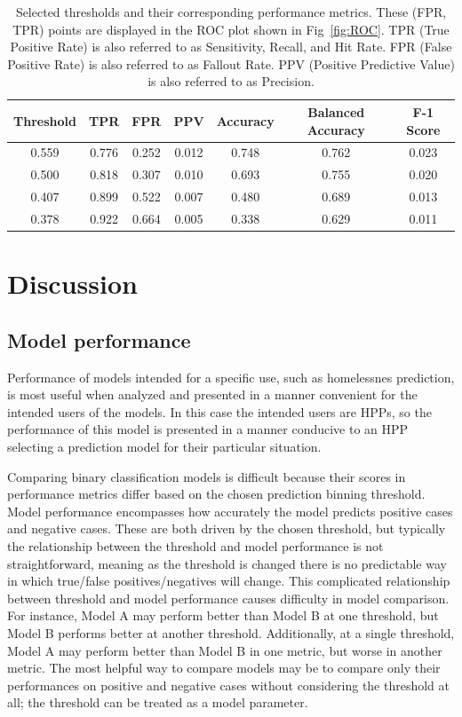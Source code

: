 \documentclass[10pt,letterpaper]{article}
\begin{document}
\begin{table}[htb]
    \centering
    \begin{tabular}{ccccccc}
        \toprule
        Threshold   &   TPR &   FPR & PPV   & Accuracy  &  Balanced Accuracy    & F-1 Score \\
        \midrule
        0.559       & 0.776 & 0.252 & 0.012 &     0.748 &     0.762             & 0.023 \\
        0.500       & 0.818 & 0.307 & 0.010 &     0.693 &     0.755             & 0.020 \\
        0.407       & 0.899 & 0.522 & 0.007 &     0.480 &     0.689             & 0.013 \\
        0.378       & 0.922 & 0.664 & 0.005 &     0.338 &     0.629             & 0.011 \\
        \bottomrule
    \end{tabular}
    \caption{Selected thresholds and their corresponding performance metrics. These (FPR, TPR) points are displayed in the ROC plot shown in Fig~\ref{fig:ROC}. TPR (True Positive Rate) is also referred to as Sensitivity, Recall, and Hit Rate. FPR (False Positive Rate) is also referred to as Fallout Rate. PPV (Positive Predictive Value) is also referred to as Precision.}
    \label{tbl:performance}
\end{table}

\section*{Discussion}
\subsection*{Model performance}
Performance of models intended for a specific use, such as homelessnes prediction, is most useful when analyzed and presented in a manner convenient for the intended users of the models. In this case the intended users are HPPs, so the performance of this model is presented in a manner conducive to an HPP selecting a prediction model for their particular situation.

Comparing binary classification models is difficult because their scores in performance metrics differ based on the chosen prediction binning threshold. Model performance encompasses how accurately the model predicts positive cases and negative cases. These are both driven by the chosen threshold, but typically the relationship between the threshold and model performance is not straightforward, meaning as the threshold is changed there is no predictable way in which true/false positives/negatives will change. This complicated relationship between threshold and model performance causes difficulty in model comparison. For instance, Model A may perform better than Model B at one threshold, but Model B performs better at another threshold. Additionally, at a single threshold, Model A may perform better than Model B in one metric, but worse in another metric. The most helpful way to compare models may be to compare only their performances on positive and negative cases without considering the threshold at all; the threshold can be treated as a model parameter.
\end{document}
